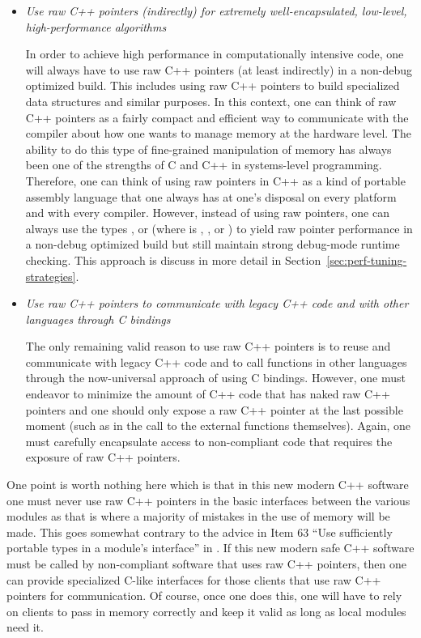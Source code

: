 \documentclass[pdf,ps2pdf,11pt]{SANDreport}
\begin{document}
\begin{itemize}

{}\item{}\textit{Use raw C++ pointers (indirectly) for extremely
well-encapsulated, low-level, high-performance algorithms}

In order to achieve high performance in computationally intensive
code, one will always have to use raw C++ pointers (at least
indirectly) in a non-debug optimized build.  This includes using raw
C++ pointers to build specialized data structures and similar
purposes.  In this context, one can think of raw C++ pointers as a
fairly compact and efficient way to communicate with the compiler
about how one wants to manage memory at the hardware level.  The
ability to do this type of fine-grained manipulation of memory has
always been one of the strengths of C and C++ in systems-level
programming.  Therefore, one can think of using raw pointers in C++ as
a kind of portable assembly language that one always has at one's
disposal on every platform and with every compiler.  However, instead
of using raw pointers, one can always use the types {},
{} or {} (where
{} is {}, {}, or
{}) to yield raw pointer performance in a non-debug
optimized build but still maintain strong debug-mode runtime checking.
This approach is discuss in more detail in
Section~\ref{sec:perf-tuning-strategies}.

{}\item{}\textit{Use raw C++ pointers to communicate with legacy C++
code and with other languages through C bindings}

The only remaining valid reason to use raw C++ pointers is to reuse
and communicate with legacy C++ code and to call functions in other
languages through the now-universal approach of using C bindings.
However, one must endeavor to minimize the amount of C++ code that has
naked raw C++ pointers and one should only expose a raw C++ pointer at
the last possible moment (such as in the call to the external
functions themselves).  Again, one must carefully encapsulate access
to non-compliant code that requires the exposure of raw C++ pointers.

\end{itemize}

One point is worth nothing here which is that in this new modern C++
software one must never use raw C++ pointers in the basic interfaces
between the various modules as that is where a majority of mistakes in
the use of memory will be made.  This goes somewhat contrary to the
advice in Item 63 ``Use sufficiently portable types in a module's
interface'' in {}\cite{C++CodingStandards05}.  If this new modern safe
C++ software must be called by non-compliant software that uses raw
C++ pointers, then one can provide specialized C-like interfaces for
those clients that use raw C++ pointers for communication.  Of course,
once one does this, one will have to rely on clients to pass in memory
correctly and keep it valid as long as local modules need it.
\end{document}

